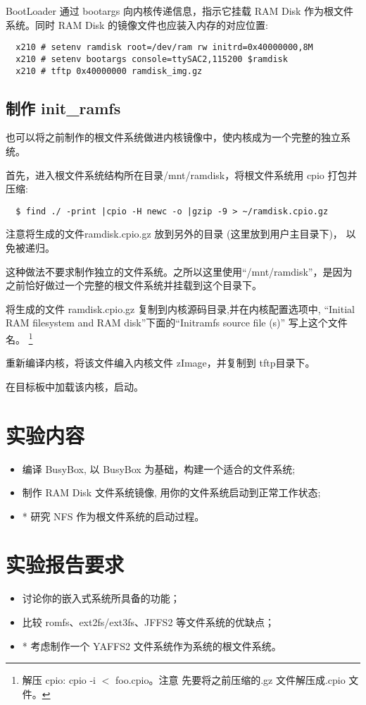 BootLoader 通过 bootargs 向内核传递信息，指示它挂载 RAM Disk 作为根文件
系统。同时 RAM Disk 的镜像文件也应装入内存的对应位置:
\begin{verbatim}
  x210 # setenv ramdisk root=/dev/ram rw initrd=0x40000000,8M
  x210 # setenv bootargs console=ttySAC2,115200 $ramdisk
  x210 # tftp 0x40000000 ramdisk_img.gz
\end{verbatim}

\subsection{制作 init\_ramfs}
也可以将之前制作的根文件系统做进内核镜像中，使内核成为一个完整的独立系统。

首先，进入根文件系统结构所在目录/mnt/ramdisk，将根文件系统用 cpio
打包并压缩:
\begin{verbatim}
  $ find ./ -print |cpio -H newc -o |gzip -9 > ~/ramdisk.cpio.gz
\end{verbatim}

注意将生成的文件ramdisk.cpio.gz 放到另外的目录 (这里放到用户主目录下)，
以免被递归。

这种做法不要求制作独立的文件系统。之所以这里使用``/mnt/ramdisk''，是因为
之前恰好做过一个完整的根文件系统并挂载到这个目录下。

将生成的文件 ramdisk.cpio.gz 复制到内核源码目录,并在内核配置选项中,
``Initial RAM filesystem and RAM disk''下面的``Initramfs source file (s)''
写上这个文件名。
\footnote{解压 cpio: cpio -i $<$ foo.cpio。注意
    先要将之前压缩的.gz 文件解压成.cpio 文件。}

重新编译内核，将该文件编入内核文件 zImage，并复制到 tftp目录下。

在目标板中加载该内核，启动。

\section{实验内容}
\begin{itemize}
  \item 编译 BusyBox, 以 BusyBox 为基础，构建一个适合的文件系统;
  \item 制作 RAM Disk 文件系统镜像, 用你的文件系统启动到正常工作状态;
  \item * 研究 NFS 作为根文件系统的启动过程。
\end{itemize}

\section{实验报告要求}
\begin{itemize}
  \item 讨论你的嵌入式系统所具备的功能；
  \item 比较 romfs、ext2fs/ext3fs、JFFS2 等文件系统的优缺点；
  \item * 考虑制作一个 YAFFS2 文件系统作为系统的根文件系统。
\end{itemize}


